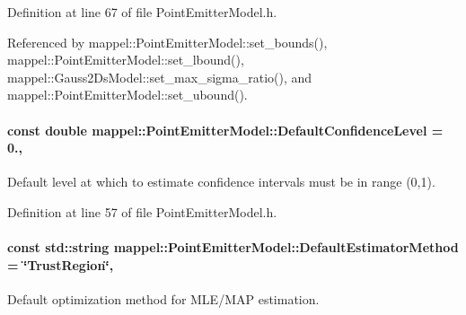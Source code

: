 Definition at line 67 of file Point\+Emitter\+Model.\+h.



Referenced by mappel\+::\+Point\+Emitter\+Model\+::set\+\_\+bounds(), mappel\+::\+Point\+Emitter\+Model\+::set\+\_\+lbound(), mappel\+::\+Gauss2\+Ds\+Model\+::set\+\_\+max\+\_\+sigma\+\_\+ratio(), and mappel\+::\+Point\+Emitter\+Model\+::set\+\_\+ubound().

\paragraph[{\texorpdfstring{Default\+Confidence\+Level}{DefaultConfidenceLevel}}]{\setlength{\rightskip}{0pt plus 5cm}const double mappel\+::\+Point\+Emitter\+Model\+::\+Default\+Confidence\+Level = 0.\hspace{0.3cm}{\ttfamily [static]}, {\ttfamily [inherited]}}\hypertarget{classmappel_1_1PointEmitterModel_ac57f7550589dcdbf3b6281e91d3e24ff}{}\label{classmappel_1_1PointEmitterModel_ac57f7550589dcdbf3b6281e91d3e24ff}


Default level at which to estimate confidence intervals must be in range (0,1). 



Definition at line 57 of file Point\+Emitter\+Model.\+h.

\paragraph[{\texorpdfstring{Default\+Estimator\+Method}{DefaultEstimatorMethod}}]{\setlength{\rightskip}{0pt plus 5cm}const std\+::string mappel\+::\+Point\+Emitter\+Model\+::\+Default\+Estimator\+Method = \char`\"{}Trust\+Region\char`\"{}\hspace{0.3cm}{\ttfamily [static]}, {\ttfamily [inherited]}}\hypertarget{classmappel_1_1PointEmitterModel_aa90f02cfd2af6acf4d8ba3bbfbe906e5}{}\label{classmappel_1_1PointEmitterModel_aa90f02cfd2af6acf4d8ba3bbfbe906e5}


Default optimization method for M\+L\+E/\+M\+AP estimation. 



